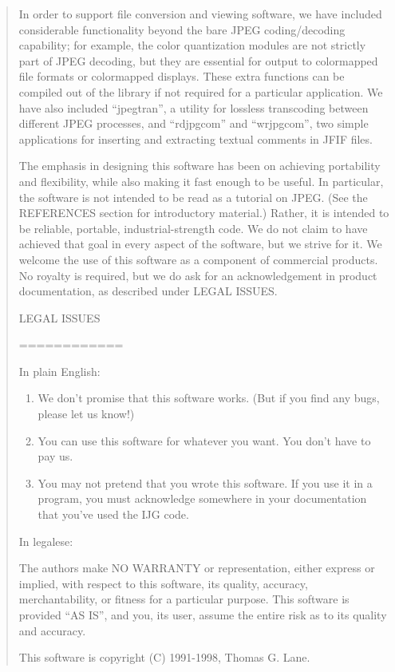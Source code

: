 \documentclass[
]{book}
\theoremstyle{definition}
\theoremstyle{definition}
\theoremstyle{definition}
\theoremstyle{definition}
\theoremstyle{remark}
\begin{document}
\begin{quote}
In order to support file conversion and viewing software, we have included
considerable functionality beyond the bare JPEG coding/decoding capability;
for example, the color quantization modules are not strictly part of JPEG
decoding, but they are essential for output to colormapped file formats or
colormapped displays. These extra functions can be compiled out of the
library if not required for a particular application. We have also included
``jpegtran'', a utility for lossless transcoding between different JPEG
processes, and ``rdjpgcom'' and ``wrjpgcom'', two simple applications for
inserting and extracting textual comments in JFIF files.

The emphasis in designing this software has been on achieving portability and
flexibility, while also making it fast enough to be useful. In particular,
the software is not intended to be read as a tutorial on JPEG. (See the
REFERENCES section for introductory material.) Rather, it is intended to
be reliable, portable, industrial-strength code. We do not claim to have
achieved that goal in every aspect of the software, but we strive for it.
We welcome the use of this software as a component of commercial products.
No royalty is required, but we do ask for an acknowledgement in product
documentation, as described under LEGAL ISSUES.

LEGAL ISSUES

============

In plain English:

\begin{enumerate}
\def\labelenumi{\arabic{enumi}.}
\item
  We don't promise that this software works. (But if you find any bugs,
  please let us know!)
\item
  You can use this software for whatever you want. You don't have to pay us.
\item
  You may not pretend that you wrote this software. If you use it in a
  program, you must acknowledge somewhere in your documentation that
  you've used the IJG code.
\end{enumerate}

In legalese:

The authors make NO WARRANTY or representation, either express or implied,
with respect to this software, its quality, accuracy, merchantability, or
fitness for a particular purpose. This software is provided ``AS IS'', and you,
its user, assume the entire risk as to its quality and accuracy.

This software is copyright (C) 1991-1998, Thomas G. Lane.


\end{quote}
\end{document}
